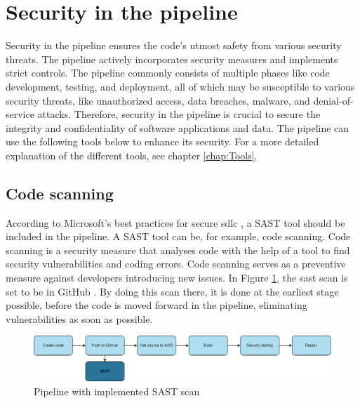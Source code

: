 \section{Security in the pipeline}
Security in the pipeline ensures the code's utmost safety from various security threats. The pipeline actively incorporates security measures and implements strict controls. The pipeline commonly consists of multiple phases like code development, testing, and deployment, all of which may be susceptible to various security threats, like unauthorized access, data breaches, malware, and denial-of-service attacks. Therefore, security in the pipeline is crucial to secure the integrity and confidentiality of software applications and data.
The pipeline can use the following tools below to enhance its security. For a more detailed explanation of the different tools, see chapter \ref{chap:Tools}. 

\subsection{Code scanning}
\label{Code Scanning}
According to Microsoft's best practices for secure \acrshort{sdlc} \cite{microsoftSDLCpractices}, a SAST tool should be included in the pipeline. A SAST tool can be, for example, code scanning. Code scanning is a security measure that analyses code with the help of a tool to find security vulnerabilities and coding errors. Code scanning serves as a preventive measure against developers introducing new issues. In Figure \ref{fig: Pipeline with implemented SAST scan}, the \acrshort{sast} scan is set to be in GitHub \cite{sastplasment}. By doing this scan there, it is done at the earliest stage possible, before the code is moved forward in the pipeline, eliminating vulnerabilities as soon as possible.

 \vspace{2mm}
\begin{figure}[H]
    \centering
    \includegraphics[width=0.8\columnwidth]{Images/pipeline2.png}
    \caption{Pipeline with implemented SAST scan}
    \label{fig: Pipeline with implemented SAST scan}
\end{figure}

